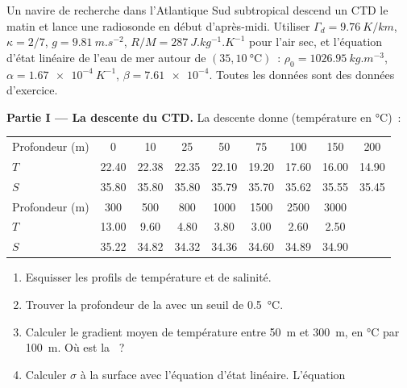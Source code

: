 \begin{problem}
\label{pb:b1:fluid-envelopes-structure:1}
Un navire de recherche dans l'Atlantique Sud subtropical descend un CTD le matin
et lance une radiosonde en début d'après-midi. Utiliser $\Gamma_d =
\qty{9.76}{K/km}$, $\kappa = 2/7$, $g = \qty{9.81}{m.s^{-2}}$, $R/M =
\qty{287}{J.kg^{-1}.K^{-1}}$ pour l'air sec, et l'équation d'état linéaire de
l'eau de mer autour de $(35, \qty{10}{\celsius})$~: $\rho_0 = \qty{1026.95}{kg.m^{-3}}$,
$\alpha = \qty{1.67e-4}{K^{-1}}$, $\beta = \num{7.61e-4}$. Toutes les données sont des
données d'exercice.

\medskip
\noindent\textbf{Partie I --- La descente du CTD.} La descente donne (température en
\si{\celsius})~:
\begin{center}
\small
\setlength{\tabcolsep}{3pt}
\begin{tabular}{|l|*{8}{c}|}
\hline
Profondeur (m) & 0 & 10 & 25 & 50 & 75 & 100 & 150 & 200 \\
$T$ & 22.40 & 22.38 & 22.35 & 22.10 & 19.20 & 17.60 & 16.00 & 14.90 \\
$S$ & 35.80 & 35.80 & 35.80 & 35.79 & 35.70 & 35.62 & 35.55 & 35.45 \\
\hline
Profondeur (m) & 300 & 500 & 800 & 1000 & 1500 & 2500 & 3000 & \\
$T$ & 13.00 & 9.60 & 4.80 & 3.80 & 3.00 & 2.60 & 2.50 & \\
$S$ & 35.22 & 34.82 & 34.32 & 34.36 & 34.60 & 34.89 & 34.90 & \\
\hline
\end{tabular}
\end{center}
\begin{enumerate}
  \item Esquisser les profils de température et de salinité.
  \item Trouver la profondeur de la  avec un seuil de \qty{0.5}{\celsius}.
  \item Calculer le gradient moyen de température entre \qty{50}{m} et
        \qty{300}{m}, en \si{\celsius} par \qty{100}{m}. Où est la
        ~?
  \item Calculer $\sigma$ à la surface avec l'équation d'état linéaire. L'équation

\end{enumerate}
\end{problem}
